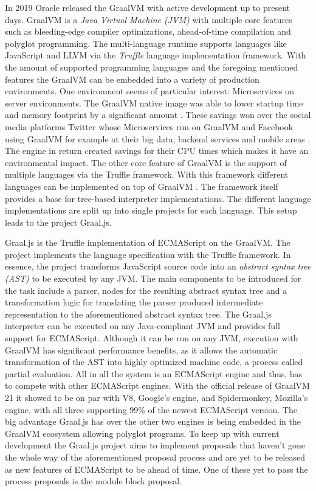 In 2019 Oracle released the GraalVM \cite{graalVMStart} with active development up to present days. GraalVM  is a \emph{Java Virtual Machine (JVM)} with multiple core features such as bleeding-edge compiler optimizations, ahead-of-time compilation and polyglot programming. The multi-language runtime supports languages like JavaScript and LLVM via the \emph{Truffle} language implementation framework. With the amount of supported programming languages and the foregoing mentioned features the GraalVM can be embedded into a variety of production environments. One environment seems of particular interest: Microservices on server environments. The GraalVM native image was able to lower startup time and memory footprint by a significant amount \cite{graalVMNative}. These savings won over the social media platforms Twitter whose Microservices run on GraalVM \cite{graalTwitter} and Facebook using GraalVM for example at their big data, backend services and mobile areas \cite{facebook}. The engine in return created savings for their CPU times which makes it have an environmental impact. The other core feature of GraalVM is the support of multiple languages via the Truffle framework. With this framework different languages can be implemented on top of GraalVM \cite{graalVMIntro}. The framework itself provides a base for tree-based interpreter implementations. The different language implementations are split up into single projects for each language. This setup leads to the project Graal.js.

Graal.js \cite{Graaljs} is the Truffle implementation of ECMAScript on the GraalVM. The project implements the language specification with the Truffle framework. In essence, the project transforms JavaScript source code into an \emph{abstract syntax tree (AST)} to be executed by any JVM. The main components to be introduced for the task include a parser, nodes for the resulting abstract syntax tree and a transformation logic for translating the parser produced intermediate representation to the aforementioned abstract syntax tree. The Graal.js interpreter can be executed on any Java-compliant JVM and provides full support for ECMAScript. Although it can be run on any JVM, execution with GraalVM has significant performance benefits, as it allows the automatic transformation of the AST into highly optimized machine code, a process called partial evaluation. All in all the system is an ECMAScript engine and thus, has to compete with other ECMAScript engines. With the official release of GraalVM 21 it showed to be on par with V8, Google's engine, and Spidermonkey, Mozilla's engine, with all three supporting 99\% of the newest ECMAScript version\cite{kangax1}. The big advantage Graal.js has over the other two engines is being embedded in the GraalVM ecosystem allowing polyglot programs. To keep up with current development the Graal.js project aims to implement proposals that haven't gone the whole way of the aforementioned proposal process and are yet to be released as new features of ECMAScript to be ahead of time. One of these yet to pass the process proposals is the module block proposal.

